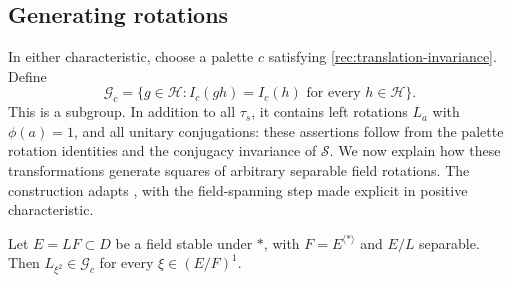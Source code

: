 \subsection{Generating rotations}

In either characteristic, choose a palette \(c\) satisfying
\eqref{rec:translation-invariance}.  Define
\[
 \mathcal G_c=\{g\in\mathcal H:I_c(gh)=I_c(h)
                       \text{ for every }h\in\mathcal H\}.
\]
This is a subgroup.  In addition to all \(\tau_s\), it contains left
rotations \(L_a\) with \(\phi(a)=1\), and all unitary conjugations:
these assertions follow from the palette rotation identities and the
conjugacy invariance of \(\mathcal S\).  We now explain how these
transformations generate squares of arbitrary separable field rotations.
The construction adapts \cite[Section~5.6]{MPNF}, with the field-spanning
step made explicit in positive characteristic.

\begin{lemma}\label{rec:field-rotations}
Let \(E=LF\subset D\) be a field stable under \(*\), with
\(F=E^{\langle *\rangle}\) and \(E/L\) separable.  Then
\(L_{\xi^2}\in\mathcal G_c\) for every \(\xi\in(E/F)^1\).
\end{lemma}

